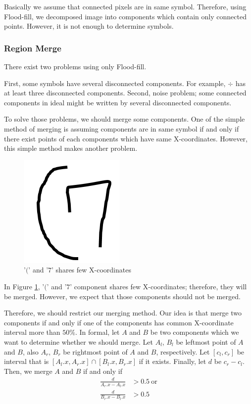 \documentclass[10pt,twocolumn,letterpaper]{article}
\begin{document}
Basically we assume that connected pixels are in same symbol. Therefore, using Flood-fill,
we decomposed image into components which contain only connected points.
However, it is not enough to determine symbols.

\subsubsection{Region Merge}

There exist two problems using only Flood-fill.

First, some symbols have several disconnected components. For example, $\div$ %
has at least three disconnected components.
Second, noise problem; some connected components in ideal might be written
by several disconnected components.

To solve those problems, we should merge some components. One of the simple method of merging
is assuming components are in same symbol if and only if there exist points of each components
which have same X-coordinates. However, this simple method makes another problem.

\begin{figure}[t]
    \begin{center}
        \includegraphics[width=0.1\linewidth]{img/little_overlapping.png}
    \end{center}
    \caption{'$($' and '$7$' shares few X-coordinates}
    \label{fig:little_overlapping}
\end{figure}

In Figure \ref{fig:little_overlapping}, '$($' and '$7$' component shares few X-coordinates;
therefore, they will be merged.
However, we expect that those components should not be merged.

Therefore, we should restrict our merging method. Our idea is that merge two components
if and only if one of the components has common X-coordinate interval more than $50\%$.
In formal, let $A$ and $B$ be two components which we want to determine whether we should merge.
Let $A_l$, $B_l$ be leftmost point of $A$ and $B$, also $A_r$, $B_r$ be rightmost point of $A$ and $B$, respectively.
Let $[c_l, c_r]$ be interval that is $[A_l.x, A_r.x] \cap [B_l.x, B_r.x]$ if it exists.
Finally, let $d$ be $c_r - c_l$.
Then, we merge $A$ and $B$ if and only if
\begin{subequations}
\label{eq:mergecondition}
\begin{align}
    \frac{d}{A_r.x - A_l.x} &> 0.5 \ \text{or} \\
    \frac{d}{B_r.x - B_l.x} &> 0.5
\end{align}
\end{subequations}
\end{document}
